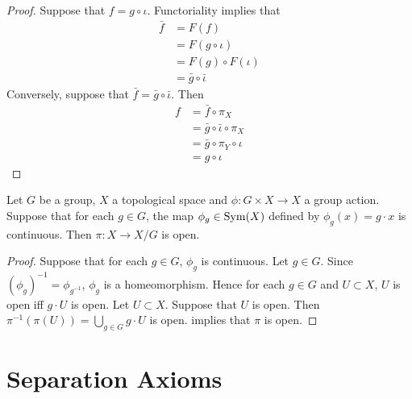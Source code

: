 \documentclass{book}
\begin{document}
	\begin{proof}
		Suppose that $f = g \circ \iota$. Functoriality implies that 
		\begin{align*}
			\bar{f} 
			& = F(f) \\
			& = F(g \circ \iota) \\
			& = F(g) \circ F(\iota) \\
			&= \bar{g} \circ \bar{\iota}
		\end{align*}
		Conversely, suppose that $\bar{f} = \bar{g} \circ \bar{\iota}$. Then
		\begin{align*}
			f
			& = \bar{f} \circ \pi_X \\
			& = \bar{g} \circ \bar{\iota} \circ \pi_X \\
			& = \bar{g} \circ \pi_Y \circ \iota \\
			& = g \circ \iota 
		\end{align*}
	\end{proof}
	
	\begin{ex}
		Let $G$ be a group, $X$ a topological space and $\phi: G \times X \rightarrow X$ a group action. Suppose that for each $g \in G$, the map $\phi_g \in \operatorname{Sym}(X)$ defined by $\phi_g(x) = g \cdot x$ is continuous. Then $\pi: X \rightarrow X / G$ is open. 
	\end{ex}

	\begin{proof}
		Suppose that for each $g \in G$, $\phi_g$ is continuous. Let $g \in G$. Since $(\phi_g)^{-1} = \phi_{g^{-1}}$, $\phi_g$ is a homeomorphism. Hence for each $g \in G$ and $U \subset X$, $U$ is open iff $g \cdot U$ is open. Let $U \subset X$. Suppose that $U$ is open. Then $\pi^{-1}(\pi(U)) = \bigcup_{g \in G} g \cdot U$ is open.  implies that $\pi$ is open.
	\end{proof}

	
	
	
	
	
	
	
	
	
	
	
	
	
	
	
	
	
	
	
	
	
	
	
	
	
	
	
	\newpage
	\section{Separation Axioms}
	
\end{document}
